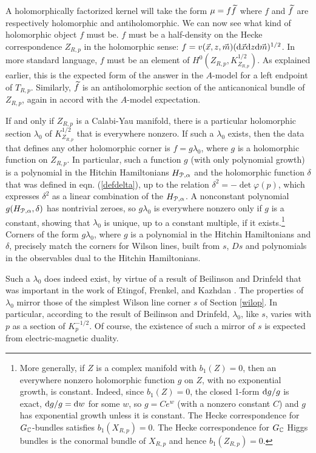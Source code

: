 \documentclass[11pt,a4paper]{article}
\begin{document}
A holomorphically factorized kernel will  take the form $\mu = f \t f$ where $f$ and $\t f$ are respectively holomorphic and antiholomorphic.
We can now see what kind of holomorphic object $f$ must be.   $f$ must be a half-density on the Hecke correspondence $Z_{R,p}$
in the holomorphic sense: $f=v(\vec x, z,\vec m) (\d \vec x\d z\d\vec m)^{1/2}$.   In more standard language, $f$ must be
an element of $H^0(Z_{R,p}, K^{1/2}_{Z_{R,p}})$.   As explained earlier, this is the expected form of the answer in the $A$-model for a left endpoint of $T_{R,p}$.
Similarly, $\t f$ is an antiholomorphic section of the anticanonical bundle of $Z_{R,p}$, again in accord with the $A$-model expectation.


 If and only if $Z_{R,p}$ is a Calabi-Yau manifold,  there is a particular holomorphic section $\lambda_0$ of $K_{Z_{R,p}}^{1/2}$
  that is everywhere nonzero.   If such a $\lambda_0$
exists, then the data that defines any other holomorphic corner is $f= g \lambda_0$, where $g$ is a holomorphic function on $Z_{R,p}$.   In particular, such
a function $g$ (with only polynomial growth) 
is a polynomial in the Hitchin Hamiltonians $H_{\P,\alpha}$ and  the holomorphic function $\delta$ that was defined in eqn. (\ref{defdelta}), up to the relation
$\delta^2 = -\det \varphi(p)$, which expresses $\delta^2$ as a linear combination of the $H_{\P,\alpha}$.
   A nonconstant polynomial  $g(H_{\P,\alpha},\delta)$ has nontrivial zeroes, so $g\lambda_0$
is everywhere nonzero only if $g$ is a constant, showing that  $\lambda_0$ is unique, up to a constant multiple, if it exists.\footnote{More generally, if $Z$ is a complex manifold with $b_1(Z)=0$, then an everywhere nonzero
holomorphic function $g$ on $Z$, with no exponential growth, is constant.    Indeed, since $b_1(Z)=0$, the closed 1-form $\d g/g$ is exact, $\d g/g=\d w$
for some $w$, so $g=C e^w$ (with a nonzero constant $C$) and $g$ has exponential growth unless it is constant.   
The Hecke correspondence for $G_\C$-bundles satisfies 
$b_1(X_{R,p})=0$.   The Hecke correspondence for $G_\C$ Higgs bundles is the conormal bundle of $X_{R,p}$ and hence $b_1(Z_{R,p})=0$.}
Corners of the form $g \lambda_0$, where $g$ is a polynomial in the Hitchin Hamiltonians and $\delta$, precisely match
 the corners for Wilson lines, built from $s$, $Ds$ and 
polynomials in the observables dual to the Hitchin Hamiltonians. 


Such a $\lambda_0$ does indeed exist, by virtue of a result of Beilinson and Drinfeld \cite{BD} that was important 
 in the work of Etingof, Frenkel, and Kazhdan \cite{EFK2}.  
 The properties of $\lambda_0$ mirror those of the simplest Wilson line corner $s$ of Section \ref{wilop}. In particular, according to the result of Beilinson and Drinfeld, $\lambda_0$, like $s$, varies with $p$ as a section  of   $K_p^{-1/2}$.  Of course, the existence of such a mirror of $s$ is expected from electric-magnetic duality.
 
\end{document}

